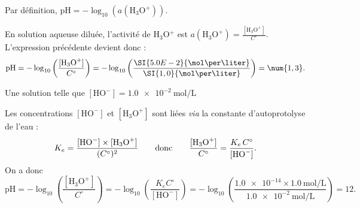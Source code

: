 
\begin{corrige}
Par définition, $\text{pH}=-\log_{10}\left(a(\text{H}_3\text{O}^+)\right)$. \minusSmallskip

En solution aqueuse diluée, l'activité de H$_3$O$^+$ est $a(\text{H}_3\text{O}^+)=\frac{[\text{H}_3\text{O}^+]}{C^\circ}$. L'expression précédente devient donc : \vspace{-1mm}
\[
\text{pH}=
-\log_{10}\left(
\frac{[\text{H}_3\text{O}^+]}{C^\circ}
\right)=
-\log_{10}\left(
\frac{\SI{5.0E-2}{\mol\per\liter}}{\SI{1,0}{\mol\per\liter}}
\right)=
\num{1,3}.
\]
\end{corrige}




\begin{enonce}
Une solution telle que $[\mathrm{HO^-}]=\SI{1,0e-2}{\mole\per\liter}$
\end{enonce}


\begin{corrige}
Les concentrations $[\text{HO}^-]$ et $[\text{H}_3\text{O}^+]$ sont liées \emph{via} la  constante d'autoprotolyse de l'eau : \vspace{-1mm}
\[\vspace{-2mm}
K_e=\frac{[\text{HO}^-]\times[\text{H}_3\text{O}^+]}{(C^\circ)^2}\qquad\text{donc}\qquad\frac{[\text{H}_3\text{O}^+]}{C^\circ}=\frac{K_e\, C^\circ}{[\text{HO}^-]}.
\]
On a donc \minusSmallskip
\[
\text{pH}=-\log_{10}\left(\frac{[\text{H}_3\text{O}^+]}{C^\circ}\right)=
-\log_{10}\left(\frac{K_e C^\circ}{[\text{HO}^-]}\right)=
-\log_{10}\left(\frac{\num{1,0e-14}\times \SI{1,0}{\mol\per\liter}}{\SI{1,0e-2}{\mol\per\liter}}\right)=
\num{12}.
\]
\end{corrige}



\finEntrainement






